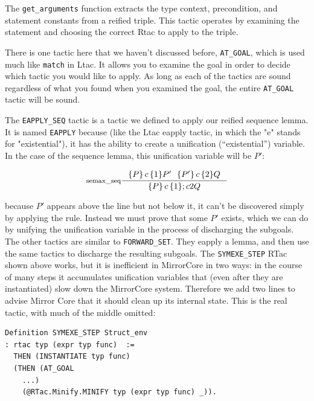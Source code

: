 \documentclass{puthesis}
\begin{document}
The \lstinline|get_arguments| function extracts the type context,
precondition, and statement constants from a reified triple. This
tactic operates by examining the statement and choosing the correct
Rtac to apply to the triple. 

There is one tactic here that we haven't discussed before,
\lstinline|AT_GOAL|, which is used much like \lstinline|match| in
Ltac. It allows you to examine the goal in order to decide which
tactic you would like to apply. As long as each of the tactics are
sound regardless of what you found when you examined the goal, the
entire \lstinline|AT_GOAL| tactic will be sound.

The \lstinline|EAPPLY_SEQ| tactic is a tactic we defined to apply our
reified sequence lemma. It is named \lstinline|EAPPLY| because (like
the Ltac eapply tactic, in which the "e" stands for "existential"), it has
the ability to create a unification (``existential'') variable. In the case of the
sequence lemma, this unification variable will be $P'$:

\[
\inference[semax\_seq]{\triple{P}c1{P'} ~~ \triple{P'}c2{Q}}
{\triple{P}c1;c2{Q}}\]

\noindent because $P'$ appears above the line but not below it, it
can't be discovered simply by applying the rule. Instead we must prove
that some $P'$ exists, which we can do by unifying the unification
variable in the process of discharging the subgoals. The other tactics
are similar to \lstinline|FORWARD_SET|. They eapply a lemma, and then
use the same tactics to discharge the resulting subgoals.  The
\lstinline|SYMEXE_STEP| RTac shown above works, but it is inefficient in
MirrorCore in two ways: in the course of many steps it
accumulates unification variables that (even after they are
instantiated) slow down the MirrorCore system.  Therefore we add
two lines to advise Mirror Core that it should clean up its internal
state.  This is the real tactic, with much of the middle omitted:

\begin{lstlisting}
Definition SYMEXE_STEP Struct_env
: rtac typ (expr typ func)  :=
  THEN (INSTANTIATE typ func)
  (THEN (AT_GOAL
    ...) 
    (@RTac.Minify.MINIFY typ (expr typ func) _)).
\end{lstlisting}
\end{document}
